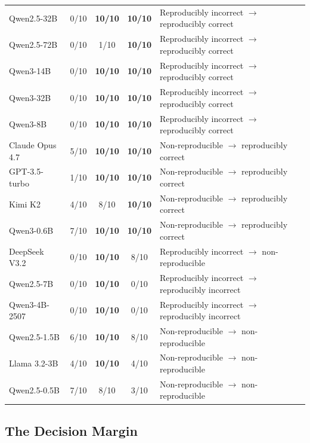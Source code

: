 \begin{table}[h]
\begin{tabular}{lcccl}
Qwen2.5-32B & 0/10 & \textbf{10/10} & \textbf{10/10} & Reproducibly incorrect $\rightarrow$ reproducibly correct \\
Qwen2.5-72B & 0/10 & 1/10 & \textbf{10/10} & Reproducibly incorrect $\rightarrow$ reproducibly correct \\
Qwen3-14B & 0/10 & \textbf{10/10} & \textbf{10/10} & Reproducibly incorrect $\rightarrow$ reproducibly correct \\
Qwen3-32B & 0/10 & \textbf{10/10} & \textbf{10/10} & Reproducibly incorrect $\rightarrow$ reproducibly correct \\
Qwen3-8B & 0/10 & \textbf{10/10} & \textbf{10/10} & Reproducibly incorrect $\rightarrow$ reproducibly correct \\
\midrule
Claude Opus 4.7 & 5/10 & \textbf{10/10} & \textbf{10/10} & Non-reproducible $\rightarrow$ reproducibly correct \\
GPT-3.5-turbo & 1/10 & \textbf{10/10} & \textbf{10/10} & Non-reproducible $\rightarrow$ reproducibly correct \\
Kimi K2 & 4/10 & 8/10 & \textbf{10/10} & Non-reproducible $\rightarrow$ reproducibly correct \\
Qwen3-0.6B & 7/10 & \textbf{10/10} & \textbf{10/10} & Non-reproducible $\rightarrow$ reproducibly correct \\
\midrule
DeepSeek V3.2 & 0/10 & \textbf{10/10} & 8/10 & Reproducibly incorrect $\rightarrow$ non-reproducible \\
\midrule
Qwen2.5-7B & 0/10 & \textbf{10/10} & 0/10 & Reproducibly incorrect $\rightarrow$ reproducibly incorrect \\
Qwen3-4B-2507 & 0/10 & \textbf{10/10} & 0/10 & Reproducibly incorrect $\rightarrow$ reproducibly incorrect \\
\midrule
Qwen2.5-1.5B & 6/10 & \textbf{10/10} & 8/10 & Non-reproducible $\rightarrow$ non-reproducible \\
Llama 3.2-3B & 4/10 & \textbf{10/10} & 4/10 & Non-reproducible $\rightarrow$ non-reproducible \\
Qwen2.5-0.5B & 7/10 & 8/10 & 3/10 & Non-reproducible $\rightarrow$ non-reproducible \\
\bottomrule
\end{tabular}
\end{table}

\subsection{The Decision Margin}
\label{sec:internal-results}

